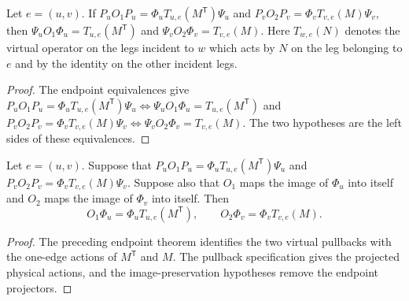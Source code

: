 \begin{theorem}%
    \label{thm:peps_edgeEndpointLocalVirtualOpOfPhysicalOp_eq_of_projected_realization_eq}
    \leanok
    Let $e=(u,v)$. If
    $P_uO_1P_u=\Phi_uT_{u,e}(M^{\mathsf T})\Psi_u$ and
    $P_vO_2P_v=\Phi_vT_{v,e}(M)\Psi_v$, then
    $\Psi_uO_1\Phi_u=T_{u,e}(M^{\mathsf T})$ and
    $\Psi_vO_2\Phi_v=T_{v,e}(M)$.
    Here $T_{w,e}(N)$ denotes the virtual operator on the legs incident to $w$
    which acts by $N$ on the leg belonging to $e$ and by the identity on the
    other incident legs.
\end{theorem}
\begin{proof}\leanok
    The endpoint equivalences give
    $P_uO_1P_u=\Phi_uT_{u,e}(M^{\mathsf T})\Psi_u
        \iff \Psi_uO_1\Phi_u=T_{u,e}(M^{\mathsf T})$
    and
    $P_vO_2P_v=\Phi_vT_{v,e}(M)\Psi_v
        \iff \Psi_vO_2\Phi_v=T_{v,e}(M)$.
    The two hypotheses are the left sides of these equivalences.
\end{proof}

\begin{theorem}%
    \label{thm:peps_edgePhysicalToVirtualInsertion_of_projected_realization_eq}
    \leanok
    Let $e=(u,v)$. Suppose that
    $P_uO_1P_u=\Phi_uT_{u,e}(M^{\mathsf T})\Psi_u$ and
    $P_vO_2P_v=\Phi_vT_{v,e}(M)\Psi_v$. Suppose also that
    $O_1$ maps the image of $\Phi_u$ into itself and $O_2$ maps the image of
    $\Phi_v$ into itself. Then
    \[
        O_1\Phi_u=\Phi_uT_{u,e}(M^{\mathsf T}),
        \qquad
        O_2\Phi_v=\Phi_vT_{v,e}(M).
    \]
\end{theorem}
\begin{proof}\leanok
    The preceding endpoint theorem identifies the two virtual pullbacks with
    the one-edge actions of $M^{\mathsf T}$ and $M$. The pullback
    specification gives the projected physical actions, and the
    image-preservation hypotheses remove the endpoint projectors.
\end{proof}

